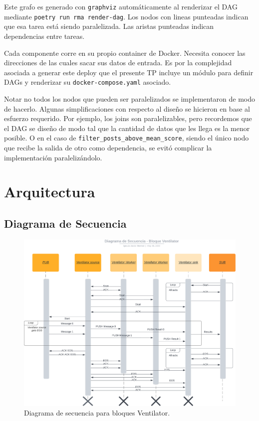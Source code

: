 \documentclass[titlepage,a4paper,oneside]{article}
\begin{document}
Este grafo es generado con \texttt{graphviz} automáticamente al renderizar el DAG mediante \texttt{poetry run rma render-dag}. Los nodos con lineas punteadas indican que esa tarea está siendo paralelizada. Las aristas punteadas indican dependencias entre tareas.

Cada componente corre en su propio container de Docker. Necesita conocer las direcciones de las cuales sacar sus datos de entrada. Es por la complejidad asociada a generar este deploy que el presente TP incluye un módulo para definir DAGs y renderizar su \texttt{docker-compose.yaml} asociado.

Notar no todos los nodos que pueden ser paralelizados se implementaron de modo de hacerlo. Algunas simplificaciones con respecto al diseño se hicieron en base al esfuerzo requerido. Por ejemplo, los joins son paralelizables, pero recordemos que el DAG se diseño de modo tal que la cantidad de datos que les llega es la menor posible. O en el caso de \texttt{filter\_posts\_above\_mean\_score}, siendo el único nodo que recibe la salida de otro como dependencia, se evitó complicar la implementación paralelizándolo.

\section{Arquitectura}
\subsection{Diagrama de Secuencia}
\begin{figure}[H]
\centering
\includegraphics[width=\textwidth]{images/SequenceVentilator.png}
\caption{Diagrama de secuencia para bloques Ventilator.}
\end{figure}
\end{document}
